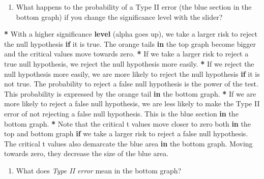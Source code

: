 \documentclass[a4paper]{book}
\newenvironment{Shaded}{\begin{snugshade}}{\end{snugshade}}
\newcommand{\KeywordTok}[1]{\textcolor[rgb]{0,0,0}{\textbf{#1}}}
\newcommand{\StringTok}[1]{\textcolor[rgb]{0.00,0.00,0.00}{#1}}
\newcommand{\ControlFlowTok}[1]{\textcolor[rgb]{0.00,0.00,0.00}{\textbf{#1}}}
\newcommand{\OperatorTok}[1]{\textcolor[rgb]{0.00,0.00,0.00}{\textbf{#1}}}
\newcommand{\NormalTok}[1]{#1}
\providecommand{\tightlist}{%
  \setlength{\itemsep}{0pt}\setlength{\parskip}{0pt}}
\theoremstyle{definition}
\theoremstyle{definition}
\theoremstyle{definition}
\theoremstyle{remark}
\begin{document}
\begin{enumerate}
\def\labelenumi{\arabic{enumi}.}
\setcounter{enumi}{7}
\tightlist
\item
  What happens to the probability of a Type II error (the blue section
  in the bottom graph) if you change the significance level with the
  slider?
\end{enumerate}

\begin{Shaded}
\begin{Highlighting}[]
\OperatorTok{*}\StringTok{ }\NormalTok{With a higher significance }\KeywordTok{level}\NormalTok{ (alpha goes up), we take a larger risk to}
\NormalTok{reject the null hypothesis }\ControlFlowTok{if}\NormalTok{ it is true. The orange tails }\ControlFlowTok{in}\NormalTok{ the top graph}
\NormalTok{become bigger and the critical values move towards zero.}
\OperatorTok{*}\StringTok{ }\NormalTok{If we take a larger risk to reject a true null hypothesis, we reject the}
\NormalTok{null hypothesis more easily.}
\OperatorTok{*}\StringTok{ }\NormalTok{If we reject the null hypothesis more easily, we are more likely to reject}
\NormalTok{the null hypothesis }\ControlFlowTok{if}\NormalTok{ it is not true. The probability to reject a false null}
\NormalTok{hypothesis is the power of the test. This probability is expressed by the}
\NormalTok{orange tail }\ControlFlowTok{in}\NormalTok{ the bottom graph.}
\OperatorTok{*}\StringTok{ }\NormalTok{If we are more likely to reject a false null hypothesis, we are less likely}
\NormalTok{to make the Type II error of not rejecting a false null hypothesis. This is}
\NormalTok{the blue section }\ControlFlowTok{in}\NormalTok{ the bottom graph.}
\OperatorTok{*}\StringTok{ }\NormalTok{Note that the critical t values move closer to zero both }\ControlFlowTok{in}\NormalTok{ the top and}
\NormalTok{bottom graph }\ControlFlowTok{if}\NormalTok{ we take a larger risk to reject a false null hypothesis. The}
\NormalTok{critical t values also demarcate the blue area }\ControlFlowTok{in}\NormalTok{ the bottom graph. Moving}
\NormalTok{towards zero, they decrease the size of the blue area.}
\end{Highlighting}
\end{Shaded}

\begin{enumerate}
\def\labelenumi{\arabic{enumi}.}
\setcounter{enumi}{8}
\tightlist
\item
  What does \emph{Type II error} mean in the bottom graph?
\end{enumerate}
\end{document}

